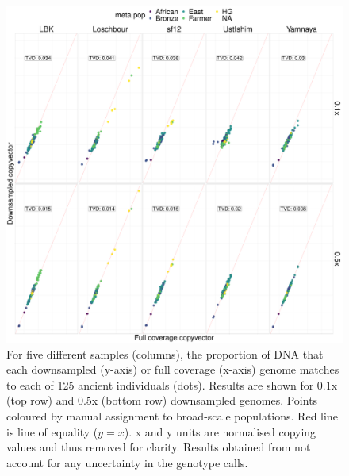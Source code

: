 \begin{figure}[htp]
    \centering
    \includegraphics[width=1.0\textwidth]{../images/appendix/standard.pdf}
    \caption{For five different samples (columns), the proportion of DNA that each downsampled (y-axis) or full coverage (x-axis) genome matches to each of 125 ancient individuals (dots). Results are shown for 0.1x (top row) and 0.5x (bottom row) downsampled genomes. Points coloured by manual assignment to broad-scale populations. Red line is line of equality ($y=x$). x and y units are normalised copying values and thus removed for clarity. Results obtained from not account for any uncertainty in the genotype calls.}
    \label{fig:alt_input_score_test_standard}
\end{figure}

